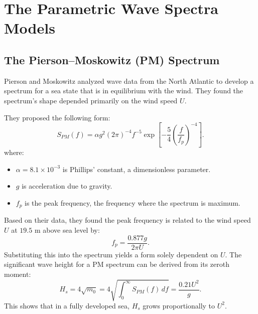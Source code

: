 \documentclass[journal,10pt,twocolumn]{IEEEtran}
\def\text#1{#1}%
\begin{document}
    \section{The Parametric Wave Spectra Models}

    \subsection{The Pierson--Moskowitz (PM) Spectrum}
    Pierson and Moskowitz analyzed wave data from the North Atlantic to develop a spectrum for a sea state that is in equilibrium with the wind. They found the spectrum's shape depended primarily on the wind speed $U$.

    They proposed the following form:
    \begin{equation}
        S_{\text{PM}}(f) = \alpha g^2 (2\pi)^{-4} f^{-5}\exp\left[-\frac{5}{4}\left(\frac{f}{f_p}\right)^{-4}\right].
    \end{equation}
    where:
    \begin{itemize}[leftmargin=1.4em]
        \item $\alpha = 8.1 \times 10^{-3}$ is Phillips' constant, a dimensionless parameter.
        \item $g$ is acceleration due to gravity.
        \item $f_p$ is the peak frequency, the frequency where the spectrum is maximum.
    \end{itemize}
    Based on their data, they found the peak frequency is related to the wind speed $U$ at $19.5$ m above sea level by:
    \begin{equation}
        f_p = \frac{0.877 g}{2\pi U}.
    \end{equation}
    Substituting this into the spectrum yields a form solely dependent on $U$. The significant wave height for a PM spectrum can be derived from its zeroth moment:
    \begin{equation}
        H_s = 4\sqrt{m_0} = 4\sqrt{\int_0^{\infty} S_{\text{PM}}(f)\, df} = \frac{0.21U^2}{g}.
    \end{equation}
    This shows that in a fully developed sea, $H_s$ grows proportionally to $U^2$.
\end{document}
